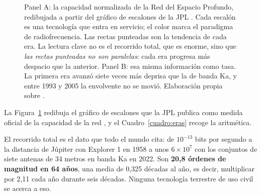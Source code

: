 \documentclass[11pt,letterpaper]{article}
\newcommand{\tx}[1]{(#1)*4.30}
\newcommand{\barraT}[5]{%
  \node[left, text width=4.55cm, align=right, font=\scriptsize] at (-0.12,#1)
       {#4};%
  \fill[#3] (0,#1-0.185) rectangle ({\tx{#2}},#1+0.185);%
  \node[right, font=\scriptsize\bfseries, text=#3] at ({\tx{#2}+0.12},#1)
       {#5};%
}
\begin{document}
\begin{figure}[!htb]
\caption{Panel A: la capacidad normalizada de la Red del Espacio Profundo,
redibujada a partir del gráfico de escalones de la JPL
\parencite{descanso2015}. Cada escalón es una tecnología que entra en
servicio; el color marca el paradigma de radiofrecuencia. Las rectas punteadas
son la tendencia de cada era. La lectura clave no es el recorrido total, que
es enorme, sino que \emph{las rectas punteadas no son paralelas}: cada era
progresa más despacio que la anterior. Panel B: esa misma información como
tasa. La primera era avanzó siete veces más deprisa que la de banda Ka, y
entre 1993 y 2005 la envolvente no se movió. Elaboración propia sobre
\textcite{descanso2015}.}
\label{fig:dsn}
\end{figure}

La Figura~\ref{fig:dsn} redibuja el gráfico de escalones que la JPL publica
como medida oficial de la capacidad de la red \parencite{descanso2015}, y el
Cuadro~\ref{cuadro:eras} recoge la aritmética.

El recorrido total es el dato que todo el mundo cita: de $10^{-13}$ bits por
segundo a la distancia de Júpiter con Explorer 1 en 1958 a unos $6\times10^{7}$
con los conjuntos de siete antenas de 34 metros en banda Ka en 2022. Son
\textbf{20,8 órdenes de magnitud en 64 años}, una media de 0,325 décadas al
año, es decir, multiplicar por 2,11 cada año durante seis décadas. Ninguna
tecnología terrestre de uso civil se acerca a eso.
\end{document}
